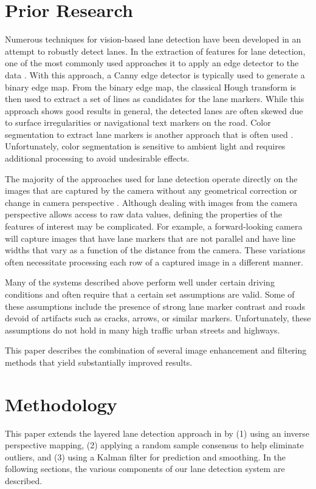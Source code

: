 \documentclass{article}
\begin{document}
\section{Prior Research}
\label{sec:prior}
Numerous techniques for vision-based lane detection have been developed in an attempt to robustly detect lanes.
In the extraction of features for lane detection, one of the most commonly used approaches it to apply an edge detector to the data \cite{assidiq_real_2008,wang_driver_2005}. With this approach, a Canny edge detector is typically used to generate a binary edge map. From the binary edge map, the classical Hough transform is then used to extract a set of lines as candidates for the lane markers.  While this approach shows good results in general, the detected lanes are often skewed due to surface irregularities or navigational text markers on the road. Color segmentation to extract lane markers is another approach that is often used \cite{sun_hsi_2006,chin_lane_2005}. Unfortunately, color segmentation is sensitive to ambient light and requires additional processing to avoid undesirable effects.

The majority of the approaches used for lane detection operate directly on the images that are captured by the camera without any geometrical correction or change in camera perspective \cite{borkar_layered_2009,assidiq_real_2008,sun_hsi_2006,wang_real-time_2006}.
Although dealing with images from the camera perspective allows access to raw data values, defining the properties of the features of interest may be complicated. For example, a forward-looking camera will capture images that have lane markers that are not parallel and have line widths that vary as a function of the distance from the camera.  These variations often necessitate processing each row of a captured image in a different manner.

Many of the systems described above perform well under certain driving conditions and often require that a certain set assumptions are valid.  Some of these assumptions include the  presence of strong lane marker contrast and roads devoid of artifacts such as cracks, arrows, or similar markers. Unfortunately, these assumptions do not hold in many high traffic urban streets and highways.

This paper describes the combination of several image enhancement and filtering methods that yield substantially improved results.

\section{Methodology}
\label{sec:methodology}
This paper extends the layered lane detection approach in \cite{borkar_layered_2009} by (1) using an inverse perspective mapping, (2) applying a random sample consensus to help eliminate outliers, and (3) using a Kalman filter for prediction and smoothing.
In the following sections, the various components of our lane detection system are described.
\end{document}
